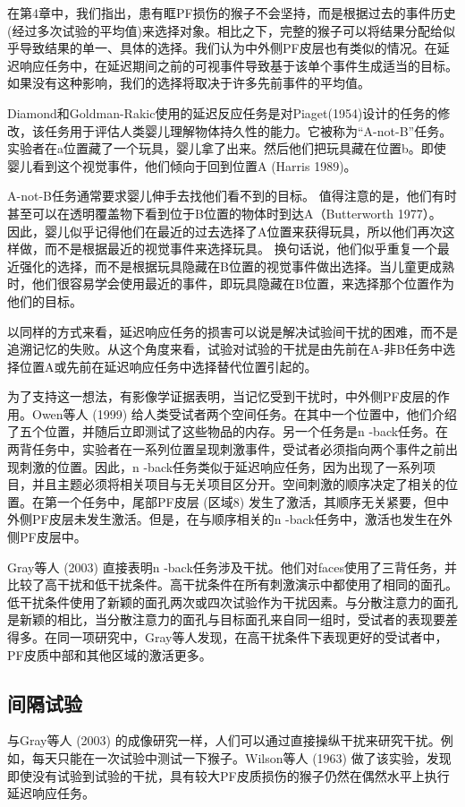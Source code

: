 在第4章中，我们指出，患有眶PF损伤的猴子不会坚持，而是根据过去的事件历史(经过多次试验的平均值)来选择对象。相比之下，完整的猴子可以将结果分配给似乎导致结果的单一、具体的选择。我们认为中外侧PF皮层也有类似的情况。在延迟响应任务中，在延迟期间之前的可视事件导致基于该单个事件生成适当的目标。如果没有这种影响，我们的选择将取决于许多先前事件的平均值。

Diamond和Goldman-Rakic使用的延迟反应任务是对Piaget(1954)设计的任务的修改，该任务用于评估人类婴儿理解物体持久性的能力。它被称为“A-not-B”任务。实验者在a位置藏了一个玩具，婴儿拿了出来。然后他们把玩具藏在位置b。即使婴儿看到这个视觉事件，他们倾向于回到位置A (Harris 1989)。

A-not-B任务通常要求婴儿伸手去找他们看不到的目标。 值得注意的是，他们有时甚至可以在透明覆盖物下看到位于B位置的物体时到达A（Butterworth 1977）。 因此，婴儿似乎记得他们在最近的过去选择了A位置来获得玩具，所以他们再次这样做，而不是根据最近的视觉事件来选择玩具。 换句话说，他们似乎重复一个最近强化的选择，而不是根据玩具隐藏在B位置的视觉事件做出选择。当儿童更成熟时，他们很容易学会使用最近的事件，即玩具隐藏在B位置，来选择那个位置作为他们的目标。

以同样的方式来看，延迟响应任务的损害可以说是解决试验间干扰的困难，而不是追溯记忆的失败。从这个角度来看，试验对试验的干扰是由先前在A-非B任务中选择位置A或先前在延迟响应任务中选择替代位置引起的。

为了支持这一想法，有影像学证据表明，当记忆受到干扰时，中外侧PF皮层的作用。Owen等人 (1999) 给人类受试者两个空间任务。在其中一个位置中，他们介绍了五个位置，并随后立即测试了这些物品的内存。另一个任务是n -back任务。在两背任务中，实验者在一系列位置呈现刺激事件，受试者必须指向两个事件之前出现刺激的位置。因此，n -back任务类似于延迟响应任务，因为出现了一系列项目，并且主题必须将相关项目与无关项目区分开。空间刺激的顺序决定了相关的位置。在第一个任务中，尾部PF皮层 (区域8) 发生了激活，其顺序无关紧要，但中外侧PF皮层未发生激活。但是，在与顺序相关的n -back任务中，激活也发生在外侧PF皮层中。

Gray等人 (2003) 直接表明n -back任务涉及干扰。他们对faces使用了三背任务，并比较了高干扰和低干扰条件。高干扰条件在所有刺激演示中都使用了相同的面孔。低干扰条件使用了新颖的面孔两次或四次试验作为干扰因素。与分散注意力的面孔是新颖的相比，当分散注意力的面孔与目标面孔来自同一组时，受试者的表现要差得多。在同一项研究中，Gray等人发现，在高干扰条件下表现更好的受试者中，PF皮质中部和其他区域的激活更多。

\subsection{间隔试验}
与Gray等人 (2003) 的成像研究一样，人们可以通过直接操纵干扰来研究干扰。例如，每天只能在一次试验中测试一下猴子。Wilson等人 (1963) 做了该实验，发现即使没有试验到试验的干扰，具有较大PF皮质损伤的猴子仍然在偶然水平上执行延迟响应任务。

